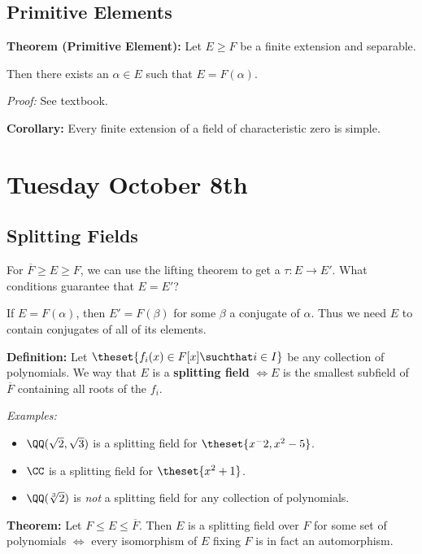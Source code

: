 \hypertarget{primitive-elements}{%
\subsection{Primitive Elements}\label{primitive-elements}}

\textbf{Theorem (Primitive Element):} Let \(E\geq F\) be a finite
extension and separable.

Then there exists an \(\alpha \in E\) such that \(E = F(\alpha)\).

\emph{Proof:} See textbook.

\textbf{Corollary:} Every finite extension of a field of characteristic
zero is simple.

\hypertarget{tuesday-october-8th}{%
\section{Tuesday October 8th}\label{tuesday-october-8th}}

\hypertarget{splitting-fields}{%
\subsection{Splitting Fields}\label{splitting-fields}}

For \(\overline F \geq E \geq F\), we can use the lifting theorem to get
a \(\tau: E \to E'\). What conditions guarantee that \(E = E'\)?

If \(E = F(\alpha)\), then \(E' = F(\beta)\) for some \(\beta\) a
conjugate of \(\alpha\). Thus we need \(E\) to contain conjugates of all
of its elements.

\textbf{Definition:} Let \(\theset{f_i(x) \in F[x] \suchthat i\in I}\)
be any collection of polynomials. We way that \(E\) is a
\textbf{splitting field} \(\iff E\) is the smallest subfield of
\(\overline F\) containing all roots of the \(f_i\).

\emph{Examples:}

\begin{itemize}
\item
  \(\QQ(\sqrt 2, \sqrt 3)\) is a splitting field for
  \(\theset{x^-2, x^2 - 5}\).
\item
  \(\CC\) is a splitting field for \(\theset{x^2 + 1}\).
\item
  \(\QQ(\sqrt[3] 2)\) is \emph{not} a splitting field for any collection
  of polynomials.
\end{itemize}

\textbf{Theorem:} Let \(F \leq E \leq \overline F\). Then \(E\) is a
splitting field over \(F\) for some set of polynomials \(\iff\) every
isomorphism of \(E\) fixing \(F\) is in fact an automorphism.

